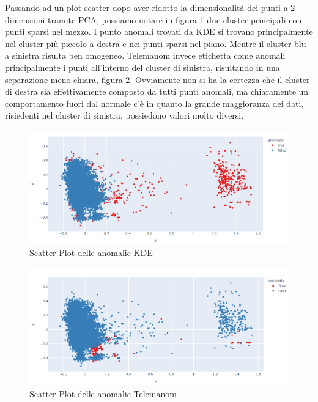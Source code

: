 Passando ad un plot scatter dopo aver ridotto la dimensionalità dei punti a 2 dimensioni tramite PCA, possiamo notare in figura \ref{kde_scatter} due cluster principali con punti sparsi nel mezzo. I punto anomali trovati da KDE si trovano principalmente nel cluster più piccolo a destra e nei punti sparsi nel piano. Mentre il cluster blu a sinistra risulta ben omogeneo.
Telemanom invece etichetta come anomali principalmente i punti all'interno del cluster di sinistra, risultando in una separazione meno chiara, figura \ref{worst_clf_scatter}.
Ovviamente non si ha la certezza che il cluster di destra sia effettivamente composto da tutti punti anomali, ma chiaramente un comportamento fuori dal normale c'è in quanto la grande maggioranza dei dati, risiedenti nel cluster di sinistra, possiedono valori molto diversi.


\begin{figure}[t]
	\centering
	\includegraphics[width=14cm, scale=1]{images/kde_scatter}
	\caption{Scatter Plot delle anomalie KDE}
	\label{kde_scatter}
		
\end{figure}




\begin{figure}[t]
	\centering
	\includegraphics[width=14cm, scale=1]{images/worst_clf_scatter}
	\caption{Scatter Plot delle anomalie Telemanom}
	\label{worst_clf_scatter}
		
\end{figure}

